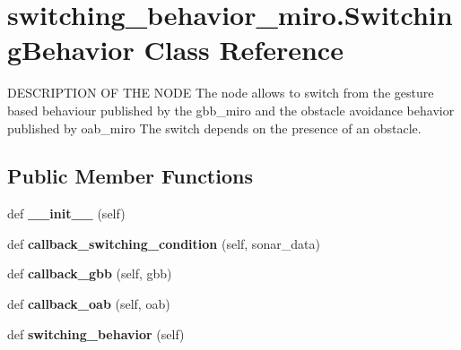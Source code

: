 \hypertarget{classswitching__behavior__miro_1_1SwitchingBehavior}{}\section{switching\+\_\+behavior\+\_\+miro.\+Switching\+Behavior Class Reference}
\label{classswitching__behavior__miro_1_1SwitchingBehavior}


D\+E\+S\+C\+R\+I\+P\+T\+I\+ON OF T\+HE N\+O\+DE The node allows to switch from the gesture based behaviour published by the gbb\+\_\+miro and the obstacle avoidance behavior published by oab\+\_\+miro The switch depends on the presence of an obstacle.  


\subsection*{Public Member Functions}
\begin{DoxyCompactItemize}
\item 
\mbox{\label{classswitching__behavior__miro_1_1SwitchingBehavior_a7ff242a8b8e3f6aa161760f8a1111410}} 
def {\bfseries \+\_\+\+\_\+init\+\_\+\+\_\+} (self)
\item 
\mbox{\label{classswitching__behavior__miro_1_1SwitchingBehavior_aa2ec67fcfd236ad1be80f5085dd1aa21}} 
def {\bfseries callback\+\_\+switching\+\_\+condition} (self, sonar\+\_\+data)
\item 
\mbox{\label{classswitching__behavior__miro_1_1SwitchingBehavior_ae563101974a52b61eb45cdf6dfb9e4e8}} 
def {\bfseries callback\+\_\+gbb} (self, gbb)
\item 
\mbox{\label{classswitching__behavior__miro_1_1SwitchingBehavior_a224069e95b06f6eaa28448a6020f93ea}} 
def {\bfseries callback\+\_\+oab} (self, oab)
\item 
\mbox{\label{classswitching__behavior__miro_1_1SwitchingBehavior_af98b244af11f28fd396ad9b518c270ff}} 
def {\bfseries switching\+\_\+behavior} (self)
\end{DoxyCompactItemize}
